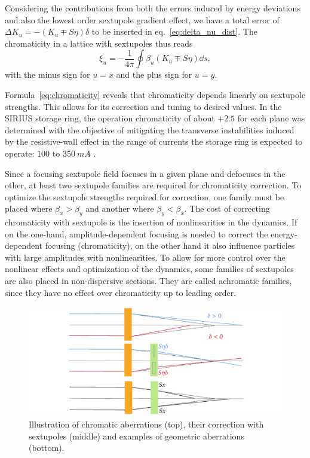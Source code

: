 Considering the contributions from both the errors induced by energy deviations and also the lowest order sextupole gradient effect, we have a total error of $\Delta K_u = -(K_u \mp S\eta)\delta$ to be inserted in eq.~\eqref{eq:delta_nu_dist}. The chromaticity in a lattice with sextupoles thus reads
\begin{equation}
    \xi_{u}=-\frac{1}{4\pi}\oint\beta_{u}(K_{u}\mp S\eta)\dd{s},
    \label{eq:chromaticity}
\end{equation}
with the minus sign for $u=x$ and the plus sign for $u=y$.

Formula~\eqref{eq:chromaticity} reveals that chromaticity depends linearly on sextupole strengths. This allows for its correction and tuning to desired values. In the SIRIUS storage ring, the operation chromaticity of about $+2.5$ for each plane was determined with the objective of mitigating the transverse instabilities induced by the resistive-wall effect in the range of currents the storage ring is expected to operate: $100$ to $350~\unit{mA}$ \cite[section 7.3]{sa_study_2018}.

 Since a focusing sextupole field focuses in a given plane and defocuses in the other, at least two sextupole families are required for chromaticity correction. To optimize the sextupole strengths required for correction, one family must be placed where $\beta_x > \beta_y$ and another where $\beta_y < \beta_x$. The cost of correcting chromaticity with sextupole is the insertion of nonlinearities in the dynamics. If on the one-hand, amplitude-dependent focusing is needed to correct the energy-dependent focusing (chromaticity), on the other hand it also influence particles with large amplitudes with nonlinearities. To allow for more control over the nonlinear effects and optimization of the dynamics, some families of sextupoles are also placed in non-dispersive sections. They are called achromatic families, since they have no effect over chromaticity up to leading order.
\begin{figure}
    \centering
    \includegraphics[width=\textwidth]{Images/chromaticity.pdf}
    \caption[Illustration of chromatic aberrations, their correction with sextupoles and examples of geometric aberrations.]{Illustration of chromatic aberrations (top), their correction with sextupoles (middle) and examples of geometric aberrations (bottom).}
    \label{fig:chromaticity}
\end{figure}

